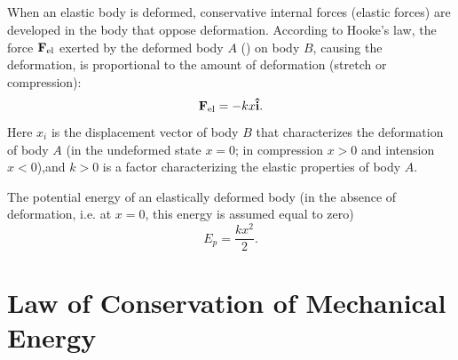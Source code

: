 \subsection{}\label{3.3.6}   When an elastic body is deformed, conservative internal forces (elastic forces) are developed in the body that oppose deformation. According to Hooke's law, the force $\vb{F}_{\textrm{el}}$ exerted by the deformed body $A$ () on body $B$, causing the deformation, is proportional to the amount of deformation (stretch or compression):
\begin{equation*}%
\vb{F}_{\textrm{el}} = - kx \vu{i}.
\end{equation*}
Here $x_{i}$ is the displacement vector of body $B$ that characterizes the deformation of body $A$ (in the undeformed state $x = 0$; in compression $x> 0$ and intension $x < 0$),and $k> 0$ is a factor characterizing the elastic properties of body $A$.

The potential energy of an elastically deformed body (in the absence of deformation, i.e. at $x = 0$, this energy is assumed equal to zero)
\begin{equation*}%
E_{p} = \frac{kx^{2}}{2}.
\end{equation*}

\section{Law of Conservation of Mechanical Energy}
\label{sec-3.4}

